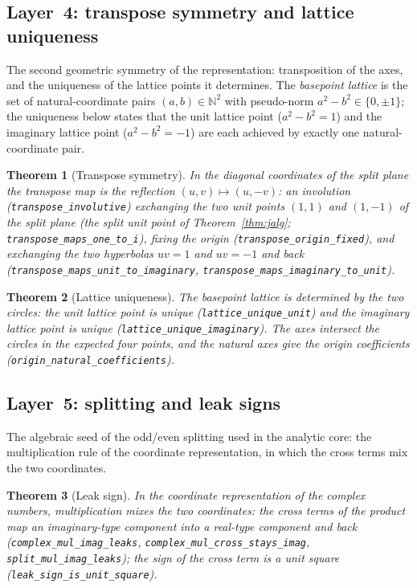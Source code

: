 \documentclass{article}
\newtheorem{theorem}{Theorem}[section]
\begin{document}
\subsection{Layer~4: transpose symmetry and lattice uniqueness}
\label{sec:L4}

The second geometric symmetry of the representation: transposition of
the axes, and the uniqueness of the lattice points it determines. The
\emph{basepoint lattice} is the set of natural-coordinate pairs
$(a,b)\in\mathbb N^2$ with pseudo-norm $a^2-b^2\in\{0,\pm1\}$; the
uniqueness below states that the unit lattice point ($a^2-b^2=1$) and
the imaginary lattice point ($a^2-b^2=-1$) are each achieved by exactly
one natural-coordinate pair.

\begin{theorem}[Transpose symmetry]
\label{thm:transpose}
In the diagonal coordinates of the split plane the transpose map is the
reflection $(u,v)\mapsto(u,-v)$: an involution
(\texttt{transpose\_involutive}) exchanging the two unit points
$(1,1)$ and $(1,-1)$ of the split plane (the split unit point of
Theorem~\ref{thm:jalg}; \texttt{transpose\_maps\_one\_to\_i}), fixing the
origin (\texttt{transpose\_origin\_fixed}), and exchanging the two
hyperbolas $uv=1$ and $uv=-1$ and back
(\texttt{transpose\_maps\_unit\_to\_imaginary},
\texttt{transpose\_maps\_imaginary\_to\_unit}).
\end{theorem}

\begin{theorem}[Lattice uniqueness]
\label{thm:lattice}
The basepoint lattice is determined by the two circles:
the unit lattice point is unique (\texttt{lattice\_unique\_unit}) and the
imaginary lattice point is unique (\texttt{lattice\_unique\_imaginary}).
The axes intersect the circles in the expected four points, and the natural
axes give the origin coefficients
(\texttt{origin\_natural\_coefficients}).
\end{theorem}

\subsection{Layer~5: splitting and leak signs}
\label{sec:L5}

The algebraic seed of the odd/even splitting used in the analytic core:
the multiplication rule of the coordinate representation, in which the
cross terms mix the two coordinates.

\begin{theorem}[Leak sign]
\label{thm:leak}
In the coordinate representation of the complex numbers, multiplication
mixes the two coordinates: the cross terms of the product map an
imaginary-type component into a real-type component and back
(\texttt{complex\_mul\_imag\_leaks},
\texttt{complex\_mul\_cross\_stays\_imag},
\texttt{split\_mul\_imag\_leaks}); the sign of the cross term is a unit
square (\texttt{leak\_sign\_is\_unit\_square}).
\end{theorem}
\end{document}
